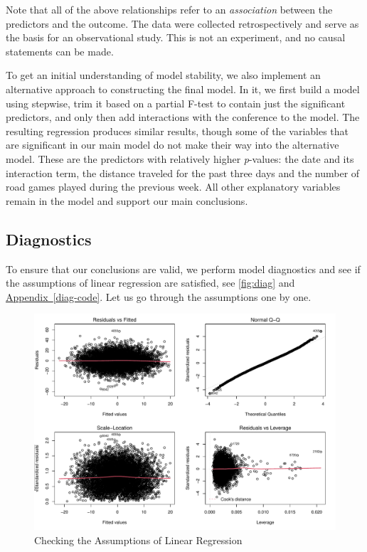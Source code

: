 \documentclass[
    12pt,
    a4paper,
    titlepage,  %
    abstract,  %
    headings=standardclasses,  %
    bibliography=totocnumbered  %
]{scrartcl}
\begin{document}
Note that all of the above relationships refer to an \emph{association} between the predictors and the outcome. The data were collected retrospectively and serve as the basis for an observational study. This is not an experiment, and no causal statements can be made.

To get an initial understanding of model stability, we also implement an alternative approach to constructing the final model. In it, we first build a model using stepwise, trim it based on a partial F-test to contain just the significant predictors, and only then add interactions with the conference to the model. The resulting regression produces similar results, though some of the variables that are significant in our main model do not make their way into the alternative model. These are the predictors with relatively higher \emph{p}-values: the date and its interaction term, the distance traveled for the past three days and the number of road games played during the previous week. All other explanatory variables remain in the model and support our main conclusions.

\subsection{Diagnostics}

To ensure that our conclusions are valid, we perform model diagnostics and see if the assumptions of linear regression are satisfied, see \autoref{fig:diag} and \hyperref[diag-code]{Appendix~\ref*{diag-code}}. Let us go through the assumptions one by one.

\begin{figure}[ht]
    \centering
    \includegraphics[width=\linewidth]{diag}
    \caption{Checking the Assumptions of Linear Regression}
    \label{fig:diag}
\end{figure}
\end{document}
